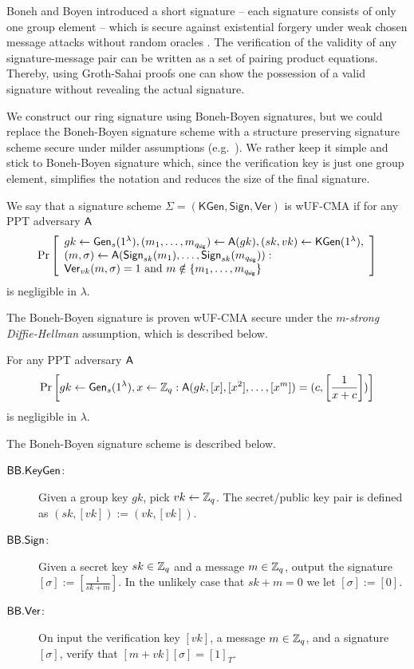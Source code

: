 Boneh and Boyen introduced a short signature -- each signature consists of only one group element -- which is secure against existential forgery under weak chosen message attacks without random oracles \cite{EC:BonBoy04a}.
The verification of the validity of any signature-message pair can be written as a set of pairing product equations. Thereby, using Groth-Sahai proofs one can show the possession of a valid signature without revealing the actual signature.

We construct our ring signature using Boneh-Boyen signatures, but we could replace the Boneh-Boyen signature scheme with a structure preserving signature scheme secure under milder assumptions (e.g.~\cite{EPRINT:JutRoy17}). We rather keep it simple and stick to Boneh-Boyen signature which, since the verification key is just one group element, simplifies the notation and reduces the size of the final signature.
 
\begin{definition} We say that a signature scheme $\Sigma = (\mathsf{KGen},\mathsf{Sign},\mathsf{Ver})$ is wUF-CMA if for any PPT adversary $\mathsf{A}$
	$$
	\Pr\left[\begin{array}{l}
	gk \gets \mathsf{Gen}_s(1^\lambda), (m_1,\ldots,m_{q_\mathsf{sig}})\gets\mathsf{A}(gk), (sk,vk)\gets\mathsf{KGen}(1^\lambda), \\
	(m,\sigma)\gets\mathsf{A}(\mathsf{Sign}_{sk}(m_1),\ldots,\mathsf{Sign}_{sk}(m_{q_\mathsf{sig}})):\\
	\mathsf{Ver}_{vk}(m,\sigma)=1 \text{ and } m\notin \{m_1,\ldots,m_{q_\mathsf{sig}}\}
	\end{array}\right]
	$$
is negligible in $\lambda$.
\end{definition}

The Boneh-Boyen signature is proven wUF-CMA secure under the $m$-\emph{strong Diffie-Hellman} assumption, which is described below.

\begin{definition}
For any PPT adversary $\mathsf{A}$
$$
\Pr\left[gk\gets\mathsf{Gen}_s(1^\lambda),x\gets\mathbb{Z}_q:\mathsf{A}(gk,[x],[x^2],\ldots,[x^m])=(c,\left[\frac{1}{x+c}\right])\right]
$$
is negligible in $\lambda$.
\end{definition}

The Boneh-Boyen signature scheme is described below.

\begin{description}
\item[$\mathsf{BB}.\mathsf{KeyGen}$:] Given a group key $gk$, pick $vk\gets\mathbb{Z}_q$. The secret/public key pair is defined as $(sk,[vk]):=(vk,[vk])$.
\item[$\mathsf{BB}.\mathsf{Sign}$:] Given a secret key $sk\in\mathbb{Z}_q$ and a message $m\in\mathbb{Z}_q$, output the signature $[\sigma]:=\left[\frac{1}{sk+m}\right]$. In the unlikely case that $sk+m=0$ we let $[\sigma]:=[0]$.
\item[$\mathsf{BB}.\mathsf{Ver}$:] On input the verification key $[vk]$, a message $m\in\mathbb{Z}_q$, and a signature $[\sigma]$, verify that $[m+vk][\sigma]=[1]_T$.
\end{description} 

